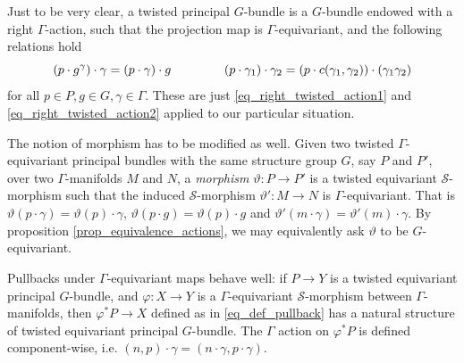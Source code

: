 \begin{obs}
    Just to be very clear, a twisted principal \(G\)-bundle is a \(G\)-bundle endowed with a right \(\Gamma\)-action, such that the projection map is \(\Gamma\)-equivariant, and the following relations hold
    \begin{equation} \label{eq_twisted_principal_bundles}
        (p\cdot g^\gamma)\cdot \gamma = (p\cdot \gamma)\cdot g \hspace{1.5 cm} (p\cdot \gamma_1)\cdot \gamma_2  = (p\cdot c(\gamma_1, \gamma_2))\cdot (\gamma_1\gamma_2)
    \end{equation}
    for all \(p \in P, g \in G, \gamma \in \Gamma\). These are just \eqref{eq_right_twisted_action1} and \eqref{eq_right_twisted_action2} applied to our particular situation.
\end{obs}

\noindent
\begin{minipage}[c]{0.79 \textwidth}
    The notion of morphism has to be modified as well. Given two twisted \(\Gamma\)-equivariant principal bundles with the same structure group \(G\), say \(P\) and \(P'\), over two \(\Gamma\)-manifolds \(M\) and \(N\), a \textit{morphism} \(\vartheta\colon P \to P'\) is a twisted equivariant \(\mathcal{S}\)-morphism such that the induced \(\mathcal{S}\)-morphism \(\vartheta'\colon M \to N\) is \(\Gamma\)-equivariant. That is \(\vartheta(p \cdot \gamma)=\vartheta(p)\cdot \gamma\), \(\vartheta(p\cdot g)=\vartheta(p)\cdot g\) and \(\vartheta'(m\cdot \gamma)=\vartheta'(m)\cdot \gamma\). By proposition \ref{prop_equivalence_actions}, we may equivalently ask \(\vartheta\) to be \(\hat{G}\)-equivariant.
\end{minipage}
\hfill %
\begin{minipage}[c]{0.20 \textwidth}
    \centering
\end{minipage}
    

Pullbacks under \(\Gamma\)-equivariant maps behave well: if \(P \to Y\) is a twisted equivariant principal \(G\)-bundle, and \(\varphi\colon X \to Y\) is a \(\Gamma\)-equivariant \(\mathcal{S}\)-morphism between \(\Gamma\)-manifolds, then \(\varphi^*P\to X\) defined as in \eqref{eq_def_pullback} has a natural structure of twisted equivariant principal \(G\)-bundle. The \(\Gamma\) action on \(\varphi^*P\) is defined component-wise, i.e. \((n,p)\cdot \gamma=(n\cdot \gamma, p\cdot \gamma)\).      

